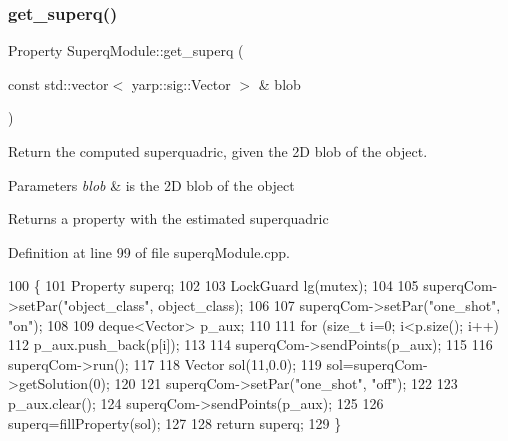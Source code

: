 \subsubsection{\texorpdfstring{get\+\_\+superq()}{get\_superq()}\hspace{0.1cm}{\footnotesize\ttfamily [2/2]}}
{\footnotesize\ttfamily Property Superq\+Module\+::get\+\_\+superq (\begin{DoxyParamCaption}\item[{const std\+::vector$<$ yarp\+::sig\+::\+Vector $>$ \&}]{blob }\end{DoxyParamCaption})\hspace{0.3cm}{\ttfamily [protected]}}



Return the computed superquadric, given the 2D blob of the object. 


\begin{DoxyParams}{Parameters}
{\em blob} & is the 2D blob of the object \\
\hline
\end{DoxyParams}
\begin{DoxyReturn}{Returns}
a property with the estimated superquadric 
\end{DoxyReturn}


Definition at line 99 of file superq\+Module.\+cpp.


\begin{DoxyCode}
100 \{
101     Property superq;
102 
103     LockGuard lg(mutex);
104 
105     superqCom->setPar(\textcolor{stringliteral}{"object\_class"}, object\_class);
106 
107     superqCom->setPar(\textcolor{stringliteral}{"one\_shot"}, \textcolor{stringliteral}{"on"});
108 
109     deque<Vector> p\_aux;
110     
111     \textcolor{keywordflow}{for} (\textcolor{keywordtype}{size\_t} i=0; i<p.size(); i++)
112         p\_aux.push\_back(p[i]);
113 
114     superqCom->sendPoints(p\_aux);
115 
116     superqCom->run();
117 
118     Vector sol(11,0.0);
119     sol=superqCom->getSolution(0);
120 
121     superqCom->setPar(\textcolor{stringliteral}{"one\_shot"}, \textcolor{stringliteral}{"off"});
122 
123     p\_aux.clear();
124     superqCom->sendPoints(p\_aux);
125 
126     superq=fillProperty(sol);
127 
128     \textcolor{keywordflow}{return} superq;
129 \}
\end{DoxyCode}
\mbox{\label{classSuperqModule_aa6825617672381dcf3eb81dc643f0aaa}} 
